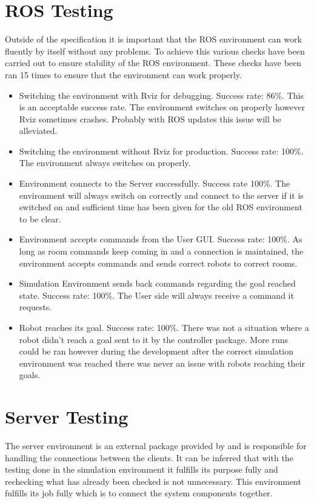     \section{ROS Testing}
      Outside of the specification it is important that the ROS environment can work fluently by itself without any problems. To achieve this various checks have been carried out to ensure stability of the ROS environment. These checks have been ran 15 times to ensure that the environment can work properly.
      \begin{itemize}
        \item Switching the environment with Rviz for debugging. Success rate: 86\%. This is an acceptable success rate. The environment switches on properly however Rviz sometimes crashes. Probably with ROS updates this issue will be alleviated.
        \item Switching the environment without Rviz for production. Success rate: 100\%. The environment always switches on properly.
        \item Environment connects to the Server successfully. Success rate 100\%. The environment will always switch on correctly and connect to the server if it is switched on and sufficient time has been given for the old ROS environment to be clear.
        \item Environment accepts commands from the User GUI. Success rate: 100\%. As long as room commands keep coming in and a connection is maintained, the environment accepts commands and sends correct robots to correct rooms.
        \item Simulation Environment sends back commands regarding the goal reached state. Success rate: 100\%. The User side will always receive a command it requests.
        \item Robot reaches its goal. Success rate: 100\%. There was not a situation where a robot didn't reach a goal sent to it by the controller package. More runs could be ran however during the development after the correct simulation environment was reached there was never an issue with robots reaching their goals.
      \end{itemize}

    \section{Server Testing}
      The server environment is an external package provided by \cite{technical} and is responsible for handling the connections between the clients. It can be inferred that with the testing done in the simulation environment it fulfills its purpose fully and rechecking what has already been checked is not unnecessary. This environment fulfills its job fully which is to connect the system components together.


